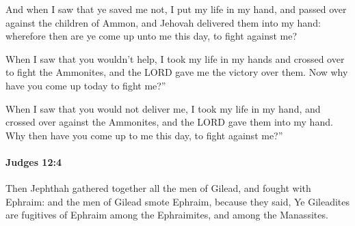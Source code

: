 			\begin{versebox}
					\item[BHS] 
					\item[ASV] And when I saw that ye saved me not, I put my life in my hand, and passed over against the children of Ammon, and Jehovah delivered them into my hand: wherefore then are ye come up unto me this day, to fight against me?
					\item[NIV] When I saw that you wouldn’t help, I took my life in my hands and crossed over to fight the Ammonites, and the LORD gave me the victory over them. Now why have you come up today to fight me?”
					\item[NRSV] When I saw that you would not deliver me, I took my life in my hand, and crossed over against the Ammonites, and the LORD gave them into my hand. Why then have you come up to me this day, to fight against me?”
			\end{versebox}

		\paragraph{Judges 12:4} %
			\label{JUDGES-12-4}

			Then Jephthah gathered together all the men of Gilead, and fought with Ephraim: and the men of Gilead smote Ephraim, because they said, Ye Gileadites are fugitives of Ephraim among the Ephraimites, and among the Manassites.

